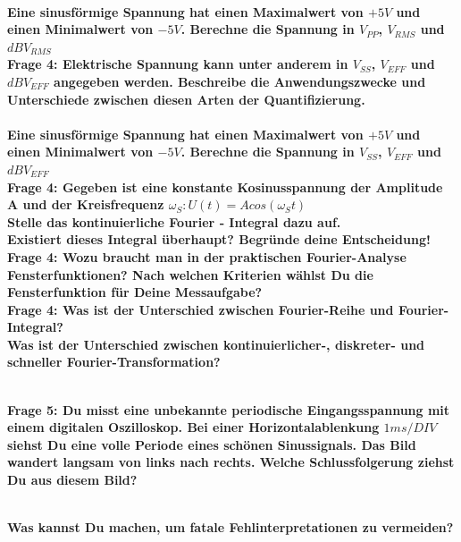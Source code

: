 \documentclass[11pt,a4paper]{scrartcl}
\begin{document}
\\

\textbf{Eine sinusförmige Spannung hat einen Maximalwert von $+5V$ und einen
Minimalwert von $-5V$. Berechne die Spannung in $V_{PP}$, $V_{RMS}$ und $dBV_{RMS}$}\\

\textbf{Frage 4: Elektrische Spannung kann unter anderem in $V_{SS}$, $V_{EFF}$ und $dBV_{EFF}$ angegeben werden. Beschreibe die Anwendungszwecke und Unterschiede zwischen diesen Arten der Quantifizierung.}\\

\\

\textbf{Eine sinusförmige Spannung hat einen Maximalwert von $+5V$ und einen
Minimalwert von $-5V$. Berechne die Spannung in $V_{SS}$, $V_{EFF}$ und $dBV_{EFF}$}\\

\textbf{Frage 4: Gegeben ist eine konstante Kosinusspannung der Amplitude A und der Kreisfrequenz $\omega_S : U(t) = A cos (\omega_St)$\\Stelle das kontinuierliche Fourier ‐ Integral dazu auf. }\\


\textbf{Existiert dieses Integral überhaupt? Begründe deine Entscheidung!}\\


\textbf{Frage 4: Wozu braucht man in der praktischen Fourier-Analyse Fensterfunktionen? Nach welchen Kriterien wählst Du die Fensterfunktion für Deine Messaufgabe?}\\


\textbf{Frage 4: Was ist der Unterschied zwischen Fourier-Reihe und Fourier-Integral? }\\

\textbf{Was ist der Unterschied zwischen kontinuierlicher-, diskreter- und schneller Fourier-Transformation?}

\\

\textbf{Frage 5: Du misst eine unbekannte periodische Eingangsspannung mit einem digitalen Oszilloskop. Bei einer Horizontalablenkung $1ms/DIV$ siehst Du eine volle Periode eines schönen Sinussignals. Das Bild wandert langsam von links nach rechts. Welche Schlussfolgerung ziehst Du aus diesem Bild?}
	
\\

\textbf{Was kannst Du machen, um fatale Fehlinterpretationen zu vermeiden?}
	
\end{document}
